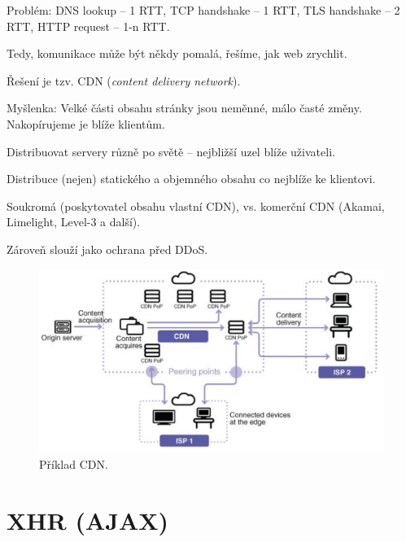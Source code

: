 \begin{compactitem}
    \item Problém: DNS lookup -- 1 RTT, TCP handshake -- 1 RTT, TLS handshake -- 2 RTT, HTTP request -- 1-n RTT.

    \item Tedy, komunikace může být někdy pomalá, řešíme, jak web zrychlit.

    \item Řešení je tzv. CDN (\textit{content delivery network}).

    \item Myšlenka: Velké části obsahu stránky jsou neměnné, málo časté změny. Nakopírujeme je blíže klientům. \begin{compactitem}
        \item Distribuovat servery různě po světě -- nejbližší uzel blíže uživateli.
        \item Distribuce (nejen) statického a objemného obsahu co nejblíže ke klientovi.
    \end{compactitem}

    \item Soukromá (poskytovatel obsahu vlastní CDN), vs. komerční CDN (Akamai, Limelight, Level-3 a další).

    \item Zároveň slouží jako ochrana před DDoS.

    \begin{figure}[H]
        \centering
        \includegraphics[width=1\linewidth]{cdn.png}
        \caption{Příklad CDN.}
    \end{figure}
\end{compactitem}


\section{XHR (AJAX)}

